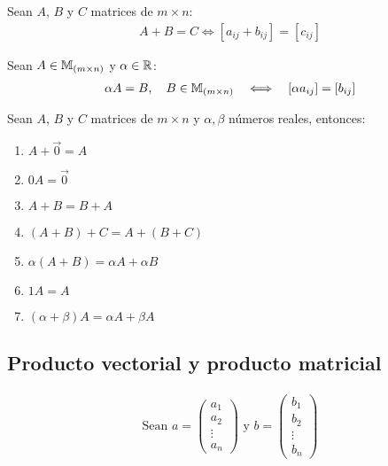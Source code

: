 \begin{definition}
{
    \label{def:1.1.5}
    Sean $A$, $B$ y $C$ matrices de $m \times n$:
    \begin{align*}
        A + B = C \Longleftrightarrow \left[ a_{ij} + b_{ij} \right] = \left[ c_{ij} \right]
    \end{align*}
}
\end{definition}

\begin{definition}
{
    \label{def:1.1.6}
    Sean $A \in \mathbb{M}_{(m \times n)}$ y $\alpha \in \mathbb{R}$:
    \begin{align*}
        \alpha A = B, \quad B \in \mathbb{M}_{(m \times n)} \quad \Longleftrightarrow \quad \left[ \alpha a_{ij} \right] = \left[ b_{ij} \right]
    \end{align*}
}
\end{definition}

\begin{teorema}
{
    \label{thm:1}
    Sean $A$, $B$ y $C$ matrices de $m \times n$ y $\alpha, \beta$ números reales, entonces: \\

    \begin{enumerate}
        \item $A + \vec{0} = A$
        \item $0A = \vec{0}$
        \item $A + B = B + A$
        \item $(A + B) + C = A + ( B + C )$
        \item $\alpha ( A + B ) = \alpha A + \alpha B$
        \item $1A = A$
        \item $(\alpha + \beta) A = \alpha A + \beta A $
    \end{enumerate}
}
\end{teorema}

\subsection{Producto vectorial y producto matricial}
\label{sec:producto_vectorial_y_producto_matricial}

\begin{align*}
    \text{Sean } a = \begin{pmatrix}
        a_1 \\
        a_2 \\
        \vdots \\
        a_n
    \end{pmatrix} \text{ y } b = \begin{pmatrix}
        b_1 \\
        b_2 \\
        \vdots \\
        b_n
    \end{pmatrix}
\end{align*}

